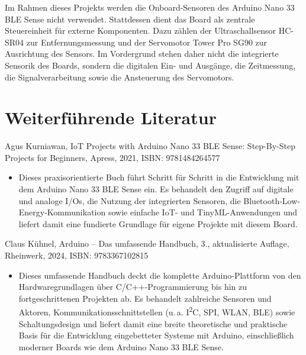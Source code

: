 Im Rahmen dieses Projekts werden die Onboard-Sensoren des Arduino Nano 33 BLE Sense nicht verwendet. Stattdessen dient das Board als zentrale Steuereinheit für externe Komponenten. Dazu zählen der Ultraschallsensor HC-SR04 zur Entfernungsmessung und der Servomotor Tower Pro SG90 zur Ausrichtung des Sensors. Im Vordergrund stehen daher nicht die integrierte Sensorik des Boards, sondern die digitalen Ein- und Ausgänge, die Zeitmessung, die Signalverarbeitung sowie die Ansteuerung des Servomotors.

\section{Weiterführende Literatur}

Agus Kurniawan, IoT Projects with Arduino Nano 33 BLE Sense: Step-By-Step Projects for Beginners, Apress, 2021, ISBN: 9781484264577 \cite{Kurniawan:2021}

\begin{itemize}
	\item Dieses praxisorientierte Buch führt Schritt für Schritt in die Entwicklung mit dem Arduino Nano 33 BLE Sense ein. Es behandelt den Zugriff auf digitale und analoge I/Os, die Nutzung der integrierten Sensoren, die Bluetooth-Low-Energy-Kommunikation sowie einfache IoT- und TinyML-Anwendungen und liefert damit eine fundierte Grundlage für eigene Projekte mit diesem Board.
\end{itemize}

Claus Kühnel, Arduino – Das umfassende Handbuch, 3., aktualisierte Auflage, Rheinwerk, 2024, ISBN: 9783367102815 \cite{Kuehnel:2024}

\begin{itemize}
	\item Dieses umfassende Handbuch deckt die komplette Arduino-Plattform von den Hardwaregrundlagen über C/C++-Programmierung bis hin zu fortgeschrittenen Projekten ab. Es behandelt zahlreiche Sensoren und Aktoren, Kommunikationsschnittstellen (u.\,a. I\textsuperscript{2}C, SPI, WLAN, BLE) sowie Schaltungsdesign und liefert damit eine breite theoretische und praktische Basis für die Entwicklung eingebetteter Systeme mit Arduino, einschließlich moderner Boards wie dem Arduino Nano 33 BLE Sense.
\end{itemize}